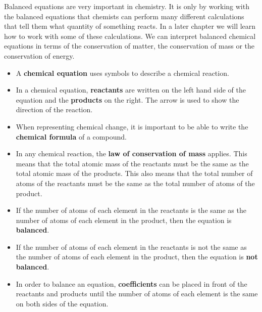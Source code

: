     \label{m38727*eip-429}Balanced equations are very important in chemistry. It is only by working with the balanced equations that chemists can perform many different calculations that tell them what quantity of something reacts. In a later chapter we will learn how to work with some of these calculations. We can interpret balanced chemical equations in terms of the conservation of matter, the conservation of mass or the conservation of energy. \label{m38727*eip-366}
            \nopagebreak
      \label{m38727*id67171}\begin{itemize}[noitemsep]
            \label{m38727*uid36}\item A \textbf{chemical equation} uses symbols to describe a chemical reaction.
\label{m38727*uid37}\item In a chemical equation, \textbf{reactants} are written on the left hand side of the equation and the \textbf{products} on the right. The arrow is used to show the direction of the reaction.
\label{m38727*uid38}\item When representing chemical change, it is important to be able to write the \textbf{chemical formula} of a compound.
\label{m38727*uid39}\item In any chemical reaction, the \textbf{law of conservation of mass} applies. This means that the total atomic mass of the reactants must be the same as the total atomic mass of the products. This also means that the total number of atoms of the reactants must be the same as the total number of atoms of the product.
\label{m38727*uid40}\item If the number of atoms of each element in the reactants is the same as the number of atoms of each element in the product, then the equation is \textbf{balanced}.
\label{m38727*uid41}\item If the number of atoms of each element in the reactants is not the same as the number of atoms of each element in the product, then the equation is \textbf{not balanced}.
\label{m38727*uid42}\item In order to balance an equation, \textbf{coefficients} can be placed in front of the reactants and products until the number of atoms of each element is the same on both sides of the equation.
\end{itemize}
